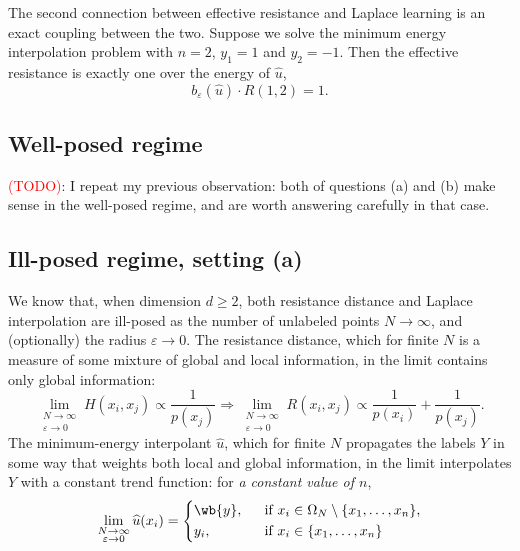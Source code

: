 \documentclass{article}
\newcommand{\1}{\mathbf{1}}
\newcommand{\wh}[1]{\widehat{#1}}
\theoremstyle{definition}
\theoremstyle{remark}
\begin{document}
The second connection between effective resistance and Laplace learning is an exact coupling between the two. Suppose we solve the minimum energy interpolation problem with $n = 2$, $y_1 = 1$ and $y_2 = -1$. Then the effective resistance is exactly one over the energy of $\wh{u}$,
\begin{equation*}
b_{\varepsilon}(\wh{u}) \cdot R(1,2) = 1.
\end{equation*}

\subsection{Well-posed regime}
\textcolor{red}{(TODO)}: I repeat my previous observation: both of questions (a) and (b) make sense in the well-posed regime, and are worth answering carefully in that case. 


\subsection{Ill-posed regime, setting (a)}
We know that, when dimension $d \geq 2$, both resistance distance and Laplace interpolation are ill-posed as the number of unlabeled points $N \to \infty$, and (optionally) the radius $\varepsilon \to 0$. The resistance distance, which for finite $N$ is a measure of some mixture of global and local information, in the limit contains only global information:
\begin{equation}
\label{eqn:resistance_distance_illposed}
\lim_{\substack{N \to \infty \\ \varepsilon \to 0}}H(x_i,x_j) \propto \frac{1}{p(x_j)} \Longrightarrow \lim_{\substack{N \to \infty \\ \varepsilon \to 0}} R(x_i,x_j) \propto \frac{1}{p(x_i)} + \frac{1}{p(x_j)}.
\end{equation}
The minimum-energy interpolant $\wh{u}$, which for finite $N$ propagates the labels $Y$ in some way that weights both local and global information, in the limit interpolates $Y$ with a constant trend function: for \emph{a constant value of $n$}, 
\begin{equation}
\label{eqn:min_energy_interpolant_illposed}
\lim_{\substack{N \to \infty \\ \varepsilon \to 0}} \wh{u}(x_i) = 
\begin{cases*}
\wb{y},& ~~\textrm{if $x_i \in \Omega_N\setminus\{x_1,\ldots,x_n\}$},\\
y_i,& ~~\textrm{if $x_i \in \{x_1,\ldots,x_n\}$}
\end{cases*}
\end{equation}
\end{document}
